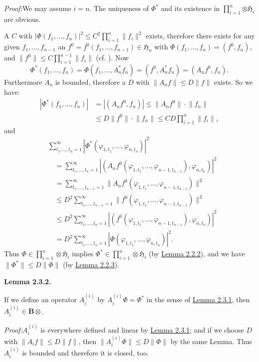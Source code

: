 \documentclass[12pt,b5paper,twoside]{article}
\newcommand{\Hspace}{\mathfrak H}
\newcommand{\B}{\mathbf B}
\newcommand{\Lemma}[1]{%
  \par\smallskip\noindent\phantomsection\label{lem:#1}\textbf{Lemma #1.}\enspace
}
\newcommand{\Proof}{\par\noindent\textit{Proof:}\enspace}
\newcommand{\lemref}[1]{\hyperref[lem:#1]{Lemma #1}}
\begin{document}
\Proof We may assume $i=n$. The uniqueness of $\Phi^*$ and its existence in
$\prod_{i=1}^{n}\bm{\otimes}\Hspace_i$ are obvious.

A $C$ with
$|\Phi(f_1,\ldots,f_n)|^2\leq C^2\prod_{i=1}^{n}\lVert f_i\rVert^2$ exists,
therefore there exists for any given $f_1,\ldots,f_{n-1}$ an
$f^0=f^0(f_1,\ldots,f_{n-1})\in\Hspace_n$ with
$\Phi(f_1,\ldots,f_n)=(f^0,f_n)$, and
$\lVert f^0\rVert\leq C\prod_{i=1}^{n-1}\lVert f_i\rVert$ (cf.
\cite[p.~94]{ref16}). Now
\[
 \Phi^*(f_1,\ldots,f_n)
 =\Phi(f_1,\ldots,A_n^*f_n)
 =(f^0,A_n^*f_n)=(A_nf^0,f_n).
\]
Furthermore $A_n$ is bounded, therefore a $D$ with
$\lVert A_nf\rVert\leq D\lVert f\rVert$ exists. So we have:
\begin{align*}
 |\Phi^*(f_1,\ldots,f_n)|
 &=|(A_nf^0,f_n)|
 \leq\lVert A_nf^0\rVert\cdot\lVert f_n\rVert\\
 &\leq D\lVert f^0\rVert\cdot\lVert f_n\rVert
 \leq CD\prod_{i=1}^{n}\lVert f_i\rVert,
\end{align*}
and
\begin{align*}
 &\sum_{t_1,\ldots,t_n=1}^{\infty}
   |\Phi^*(\varphi_{1,t_1},\ldots,\varphi_{n,t_n})|^2\\
 &\quad=\sum_{t_1,\ldots,t_n=1}^{\infty}
   |(A_nf^0(\varphi_{1,t_1},\ldots,\varphi_{n-1,t_{n-1}}),
      \varphi_{n,t_n})|^2\\
 &\quad=\sum_{t_1,\ldots,t_{n-1}=1}^{\infty}
   \lVert A_nf^0(\varphi_{1,t_1},\ldots,
                    \varphi_{n-1,t_{n-1}})\rVert^2\\
 &\quad\leq D^2\sum_{t_1,\ldots,t_{n-1}=1}^{\infty}
   \lVert f^0(\varphi_{1,t_1},\ldots,
               \varphi_{n-1,t_{n-1}})\rVert^2\\
 &\quad\leq D^2\sum_{t_1,\ldots,t_n=1}^{\infty}
   |(f^0(\varphi_{1,t_1},\ldots,\varphi_{n-1,t_{n-1}}),
      \varphi_{n,t_n})|^2\\
 &\quad=D^2\sum_{t_1,\ldots,t_n=1}^{\infty}
   |\Phi(\varphi_{1,t_1},\ldots,\varphi_{n,t_n})|^2.
\end{align*}
Thus $\Phi\in\prod_{i=1}^{n}\otimes\Hspace_i$ implies
$\Phi^*\in\prod_{i=1}^{n}\otimes\Hspace_i$ (by \lemref{2.2.2}), and we
have $\lVert\Phi^*\rVert\leq D\lVert\Phi\rVert$ (by \lemref{2.2.3}).

\Lemma{2.3.2}
If we define an operator $A_i^{(i)}$ by $A_i^{(i)}\Phi=\Phi^*$ in the sense
of \lemref{2.3.1}, then $A_i^{(i)}\in\B\otimes$.

\Proof $A_i^{(i)}$ is everywhere defined and linear by \lemref{2.3.1}; and
if we choose $D$ with $\lVert A_if\rVert\leq D\lVert f\rVert$, then
$\lVert A_i^{(i)}\Phi\rVert\leq D\lVert\Phi\rVert$ by the same Lemma. Thus
$A_i^{(i)}$ is bounded and therefore it is closed, too.
\end{document}
